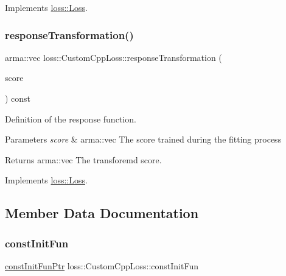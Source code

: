 Implements \hyperlink{classloss_1_1_loss_ae9f94dd9b8311397583ba3a9cb485e94}{loss\+::\+Loss}.

\mbox{\label{classloss_1_1_custom_cpp_loss_a8ef296a7db08423f68dd389824b5aa77}} 
\subsubsection{\texorpdfstring{response\+Transformation()}{responseTransformation()}}
{\footnotesize\ttfamily arma\+::vec loss\+::\+Custom\+Cpp\+Loss\+::response\+Transformation (\begin{DoxyParamCaption}\item[{const arma\+::vec \&}]{score }\end{DoxyParamCaption}) const\hspace{0.3cm}{\ttfamily [virtual]}}



Definition of the response function. 


\begin{DoxyParams}{Parameters}
{\em score} & {\ttfamily arma\+::vec} The score trained during the fitting process\\
\hline
\end{DoxyParams}
\begin{DoxyReturn}{Returns}
{\ttfamily arma\+::vec} The transforemd score. 
\end{DoxyReturn}


Implements \hyperlink{classloss_1_1_loss_a0a84b7df79b08e40b538aaa7e6ee75c4}{loss\+::\+Loss}.



\subsection{Member Data Documentation}
\mbox{\label{classloss_1_1_custom_cpp_loss_a34729cf071027991d7395b5d0ef86624}} 
\subsubsection{\texorpdfstring{const\+Init\+Fun}{constInitFun}}
{\footnotesize\ttfamily \hyperlink{namespaceloss_af21a5d5ed7431ecbc73730ce2bde3987}{const\+Init\+Fun\+Ptr} loss\+::\+Custom\+Cpp\+Loss\+::const\+Init\+Fun\hspace{0.3cm}{\ttfamily [private]}}



